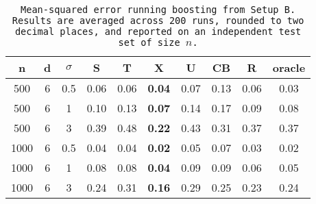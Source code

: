 \begin{table}[ht]
\centering
\begin{tabular}{cccccccccc}
  \hline
n & d & $\sigma$ & S & T & X & U & CB & R & oracle \\ 
  \hline
500 & 6 & 0.5 & 0.06 & 0.06 & \bf 0.04 & 0.07 & 0.13 & 0.06 & 0.03 \\ 
  500 & 6 & 1 & 0.10 & 0.13 & \bf 0.07 & 0.14 & 0.17 & 0.09 & 0.08 \\ 
  500 & 6 & 3 & 0.39 & 0.48 & \bf 0.22 & 0.43 & 0.31 & 0.37 & 0.37 \\ 
  1000 & 6 & 0.5 & 0.04 & 0.04 & \bf 0.02 & 0.05 & 0.07 & 0.03 & 0.02 \\ 
  1000 & 6 & 1 & 0.08 & 0.08 & \bf 0.04 & 0.09 & 0.09 & 0.06 & 0.05 \\ 
  1000 & 6 & 3 & 0.24 & 0.31 & \bf 0.16 & 0.29 & 0.25 & 0.23 & 0.24 \\ 
   \hline
\end{tabular}
\caption{\tt Mean-squared error running \texttt{boosting} from Setup B. Results are averaged across 200 runs, rounded to two decimal places, and reported on an independent test set of size $n$.} 
\label{table:setup2}
\end{table}
